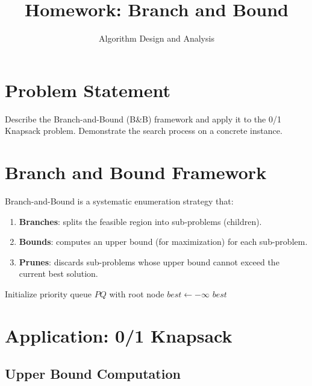 \documentclass[12pt]{article}
\title{Homework: Branch and Bound}
\author{Algorithm Design and Analysis}
\date{}
\begin{document}
\maketitle

\section{Problem Statement}

Describe the Branch-and-Bound (B\&B) framework and apply it to the 0/1 Knapsack problem.
Demonstrate the search process on a concrete instance.

\section{Branch and Bound Framework}

Branch-and-Bound is a systematic enumeration strategy that:
\begin{enumerate}
  \item \textbf{Branches}: splits the feasible region into sub-problems (children).
  \item \textbf{Bounds}: computes an upper bound (for maximization) for each sub-problem.
  \item \textbf{Prunes}: discards sub-problems whose upper bound cannot exceed the current best solution.
\end{enumerate}

\begin{algorithm}[H]
\SetAlgoLined
{}
Initialize priority queue $PQ$ with root node\;
$best \leftarrow -\infty$\;
\Return $best$\;
\caption{Generic Branch-and-Bound (Best-First)}
\end{algorithm}

\section{Application: 0/1 Knapsack}

\subsection*{Upper Bound Computation}
\end{document}
